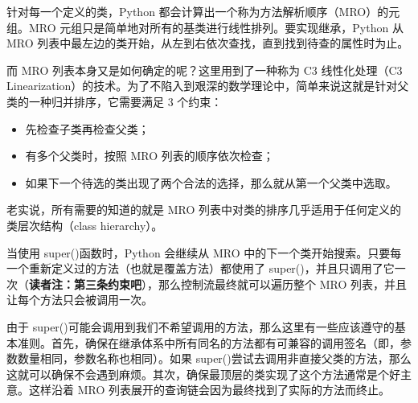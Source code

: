 针对每一个定义的类，Python 都会计算出一个称为方法解析顺序（MRO）的元组。MRO 元组只是简单地对所有的基类进行线性排列。要实现继承，Python 从 MRO 列表中最左边的类开始，从左到右依次查找，直到找到待查的属性时为止。

而 MRO 列表本身又是如何确定的呢？这里用到了一种称为 C3 线性化处理（C3 Linearization）的技术。为了不陷入到艰深的数学理论中，简单来说这就是针对父类的一种归并排序，它需要满足 3 个约束：
\begin{itemize}
    \item 先检查子类再检查父类；
    \item 有多个父类时，按照 MRO 列表的顺序依次检查；
    \item 如果下一个待选的类出现了两个合法的选择，那么就从第一个父类中选取。
\end{itemize}
老实说，所有需要的知道的就是 MRO 列表中对类的排序几乎适用于任何定义的类层次结构（class hierarchy）。

当使用 super()函数时，Python 会继续从 MRO 中的下一个类开始搜索。只要每一个重新定义过的方法（也就是覆盖方法）都使用了 super()，并且只调用了它一次（\textbf{读者注：第三条约束吧}），那么控制流最终就可以遍历整个 MRO 列表，并且让每个方法只会被调用一次。

由于 super()可能会调用到我们不希望调用的方法，那么这里有一些应该遵守的基本准则。首先，确保在继承体系中所有同名的方法都有可兼容的调用签名（即，参数数量相同，参数名称也相同）。如果 super()尝试去调用非直接父类的方法，那么这就可以确保不会遇到麻烦。其次，确保最顶层的类实现了这个方法通常是个好主意。这样沿着 MRO 列表展开的查询链会因为最终找到了实际的方法而终止。